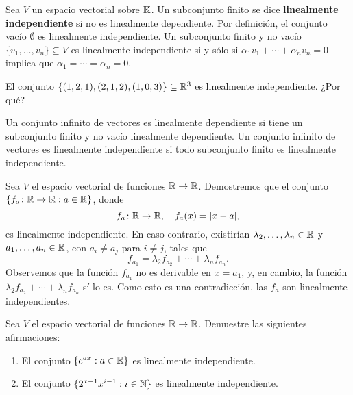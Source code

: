 \begin{block}
    Sea $V$ un espacio vectorial sobre $\mathbb{K}$.  Un subconjunto finito se dice
    \textbf{linealmente independiente} si no es linealmente dependiente.
    Por definición, el conjunto vacío $\emptyset$ es linealmente independiente. Un subconjunto
    finito y no vacío $\{v_1,\dots,v_n\}\subseteq V$ es linealmente
    independiente si y sólo si $\alpha_1v_1+\cdots+\alpha_nv_n=0$ implica que
    $\alpha_1=\cdots=\alpha_n=0$. 
\end{block}

\begin{example}
	El conjunto $\{(1,2,1),(2,1,2),(1,0,3)\}\subseteq\mathbb{R}^3$ es linealmente
	independiente.  ¿Por qué?
\end{example}

\begin{block}
    Un conjunto infinito de vectores es linealmente dependiente si tiene un
    subconjunto finito y no vacío linealmente dependiente. Un conjunto infinito
    de vectores es linealmente independiente si todo subconjunto finito es
    linealmente independiente. 
\end{block}

\begin{example}
    Sea $V$ el espacio vectorial de funciones $\mathbb{R}\to\mathbb{R}$. Demostremos que el
    conjunto $\{f_a\colon\mathbb{R}\to\mathbb{R}:a\in\mathbb{R}\}$, donde 
    \[
        f_a\colon\mathbb{R}\to\mathbb{R},\quad
        f_a(x)=|x-a|,
    \]
    es linealmente independiente.  En caso contrario, existirían
    $\lambda_2,\dots,\lambda_n\in\mathbb{R}$ y $a_1,\dots,a_n\in\mathbb{R}$, con $a_i\ne a_j$
    para $i\ne j$, tales que
    \[
        f_{a_1}=\lambda_2f_{a_2}+\cdots+\lambda_nf_{a_{n}}.
    \]
    Observemos que la función
    $f_{a_1}$ no es derivable en $x=a_1$, y, en cambio, la función
    $\lambda_2f_{a_2}+\cdots+\lambda_nf_{a_{n}}$ sí lo es. Como esto es una
    contradicción, las $f_a$ son linealmente independientes.
\end{example}

\begin{xca}
    Sea $V$ el espacio vectorial de funciones $\mathbb{R}\to\mathbb{R}$. Demuestre las
    siguientes afirmaciones:
    \begin{enumerate}
        \item El conjunto $\{e^{ax}:a\in\mathbb{R}\}$ es linealmente independiente.
        \item El conjunto $\{2^{x-1}x^{i-1}:i\in\mathbb{N}\}$ es linealmente independiente.
    \end{enumerate}
\end{xca}

